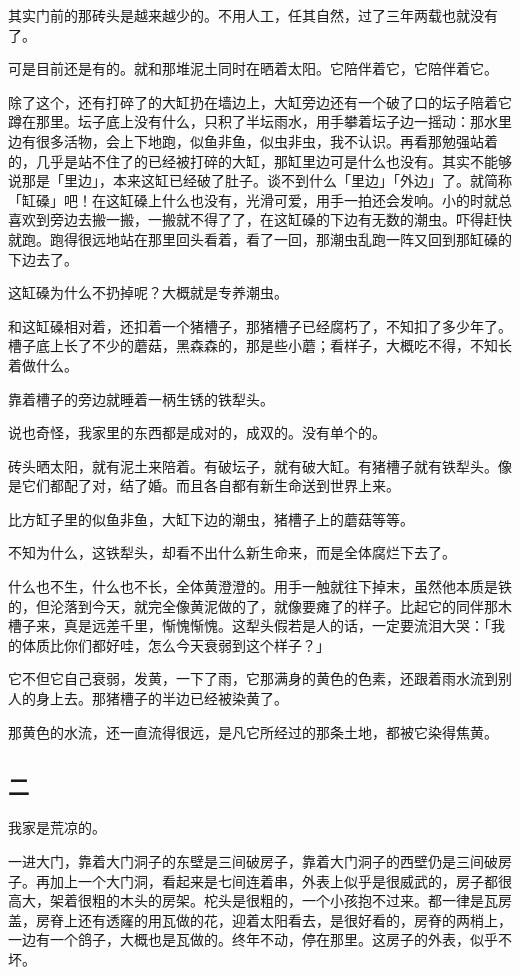 \documentclass[UTF8]{ctexart}
\begin{document}
其实门前的那砖头是越来越少的。不用人工，任其自然，过了三年两载也就没有了。

可是目前还是有的。就和那堆泥土同时在晒着太阳。{它陪伴着它，它陪伴着它。}

除了这个，还有打碎了的大缸扔在墙边上，大缸旁边还有一个破了口的坛子陪着它蹲在那里。坛子底上没有什么，只积了半坛雨水，用手攀着坛子边一摇动：那水里边有很多活物，会上下地跑，似鱼非鱼，似虫非虫，我不认识。再看那勉强站着的，几乎是站不住了的已经被打碎的大缸，那缸里边可是什么也没有。其实不能够说那是「里边」，本来这缸已经破了肚子。谈不到什么「里边」「外边」了。就简称「缸磉」吧！在这缸磉上什么也没有，光滑可爱，用手一拍还会发响。小的时就总喜欢到旁边去搬一搬，一搬就不得了了，在这缸磉的下边有无数的潮虫。吓得赶快就跑。跑得很远地站在那里回头看着，看了一回，那潮虫乱跑一阵又回到那缸磉的下边去了。

这缸磉为什么不扔掉呢？大概就是专养潮虫。

和这缸磉相对着，还扣着一个猪槽子，那猪槽子已经腐朽了，不知扣了多少年了。槽子底上长了不少的蘑菇，黑森森的，那是些小蘑；看样子，大概吃不得，不知长着做什么。

靠着槽子的旁边就睡着一柄生锈的铁犁头。

说也奇怪，我家里的东西都是成对的，成双的。没有单个的。

砖头晒太阳，就有泥土来陪着。有破坛子，就有破大缸。有猪槽子就有铁犁头。像是它们都配了对，结了婚。而且各自都有新生命送到世界上来。

比方缸子里的似鱼非鱼，大缸下边的潮虫，猪槽子上的蘑菇等等。

不知为什么，这铁犁头，却看不出什么新生命来，而是全体腐烂下去了。

什么也不生，什么也不长，全体黄澄澄的。用手一触就往下掉末，虽然他本质是铁的，但沦落到今天，就完全像黄泥做的了，就像要瘫了的样子。比起它的同伴那木槽子来，真是远差千里，惭愧惭愧。这犁头假若是人的话，一定要流泪大哭：「我的体质比你们都好哇，怎么今天衰弱到这个样子？」

它不但它自己衰弱，发黄，一下了雨，它那满身的黄色的色素，还跟着雨水流到别人的身上去。那猪槽子的半边已经被染黄了。

那黄色的水流，还一直流得很远，是凡它所经过的那条土地，都被它染得焦黄。

\subsection{二}

{我家是荒凉的。}

一进大门，靠着大门洞子的东壁是三间破房子，靠着大门洞子的西壁仍是三间破房子。再加上一个大门洞，看起来是七间连着串，外表上似乎是很威武的，房子都很高大，架着很粗的木头的房架。柁头是很粗的，一个小孩抱不过来。都一律是瓦房盖，房脊上还有透窿的用瓦做的花，迎着太阳看去，是很好看的，房脊的两梢上，一边有一个鸽子，大概也是瓦做的。终年不动，停在那里。这房子的外表，似乎不坏。
\end{document}
